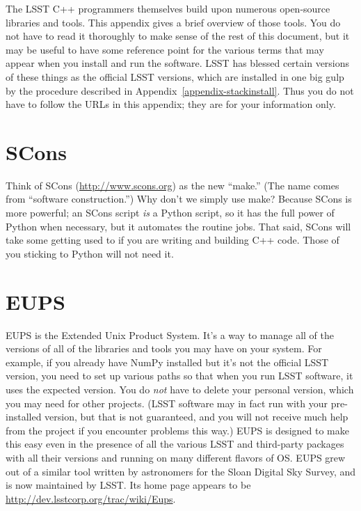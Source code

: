 
The LSST C++ programmers themselves build upon numerous open-source
libraries and tools.  This appendix gives a brief overview of those
tools.  You do not have to read it thoroughly to make sense of the
rest of this document, but it may be useful to have some reference
point for the various terms that may appear when you install and run
the software.  LSST has blessed certain versions of these things as
the official LSST versions, which are installed in one big gulp by the
procedure described in Appendix~\ref{appendix-stackinstall}.  Thus you
do not have to follow the URLs in this appendix; they are for your
information only.

\section{SCons}

Think of SCons (\url{http://www.scons.org}) as the new ``make.''  (The
name comes from ``software construction.'')  Why don't we simply use
make?  Because SCons is more powerful; an SCons script {\it is} a
Python script, so it has the full power of Python when necessary, but
it automates the routine jobs.  That said, SCons will take some
getting used to if you are writing and building C++ code.  Those of
you sticking to Python will not need it.

\section{EUPS}

EUPS is the Extended Unix Product System.  It's a way to manage all of
the versions of all of the libraries and tools you may have on your
system.  For example, if you already have NumPy installed but it's not
the official LSST version, you need to set up various paths so that
when you run LSST software, it uses the expected version.  You do {\it
  not} have to delete your personal version, which you may need for
other projects.  (LSST software may in fact run with your
pre-installed version, but that is not guaranteed, and you will not
receive much help from the project if you encounter problems this
way.)  EUPS is designed to make this easy even in the presence of all
the various LSST and third-party packages with all their versions and
running on many different flavors of OS.  EUPS grew out of a similar
tool written by astronomers for the Sloan Digital Sky Survey, and is
now maintained by LSST.  Its home page appears to be
\url{http://dev.lsstcorp.org/trac/wiki/Eups}.

